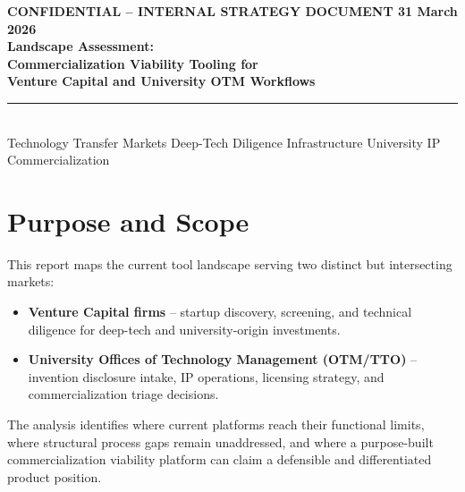 \documentclass[11pt]{article}
\begin{document}
\thispagestyle{empty}

\begin{tcolorbox}[
  enhanced,
  colback=navydark,
  colframe=navydark,
  boxrule=0pt, arc=0pt,
  left=20pt, right=20pt, top=20pt, bottom=20pt
]
  {\color{white}\footnotesize\bfseries\MakeUppercase{Confidential -- Internal Strategy Document}%
   \hfill 31 March 2026}\\[10pt]
  {\color{white}\LARGE\bfseries
    Landscape Assessment:\\[5pt]
    Commercialization Viability Tooling for\\[4pt]
    Venture Capital and University OTM Workflows}\\[10pt]
  \textcolor{accentamber}{\rule{\linewidth}{1.8pt}}\\[8pt]
  {\color{white}\small
    Technology Transfer Markets
    \enspace\textcolor{accentamber}{\textbullet}\enspace
    Deep-Tech Diligence Infrastructure
    \enspace\textcolor{accentamber}{\textbullet}\enspace
    University IP Commercialization
  }
\end{tcolorbox}

\vspace{6pt}

\section{Purpose and Scope}

This report maps the current tool landscape serving two distinct but intersecting
markets:
\begin{itemize}
  \item \textbf{Venture Capital firms} -- startup discovery, screening, and
        technical diligence for deep-tech and university-origin investments.
  \item \textbf{University Offices of Technology Management (OTM/TTO)} --
        invention disclosure intake, IP operations, licensing strategy, and
        commercialization triage decisions.
\end{itemize}

The analysis identifies where current platforms reach their functional limits,
where structural process gaps remain unaddressed, and where a purpose-built
commercialization viability platform can claim a defensible and differentiated
product position.
\end{document}
